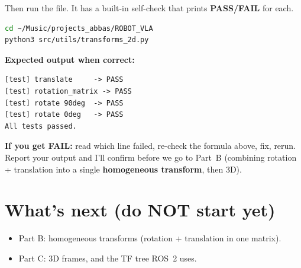 \documentclass[11pt]{article}
\begin{document}
Then run the file. It has a built-in self-check that prints \textbf{PASS/FAIL} for
each.

\begin{lstlisting}[language=bash]
cd ~/Music/projects_abbas/ROBOT_VLA
python3 src/utils/transforms_2d.py
\end{lstlisting}

\textbf{Expected output when correct:}
\begin{lstlisting}
[test] translate     -> PASS
[test] rotation_matrix -> PASS
[test] rotate 90deg  -> PASS
[test] rotate 0deg   -> PASS
All tests passed.
\end{lstlisting}

\textbf{If you get FAIL:} read which line failed, re-check the formula above, fix,
rerun. Report your output and I'll confirm before we go to Part~B (combining
rotation + translation into a single \textbf{homogeneous transform}, then 3D).

\section*{What's next (do NOT start yet)}
\begin{itemize}[leftmargin=*]
  \item Part B: homogeneous transforms (rotation + translation in one matrix).
  \item Part C: 3D frames, and the TF tree ROS~2 uses.
\end{itemize}
\end{document}
